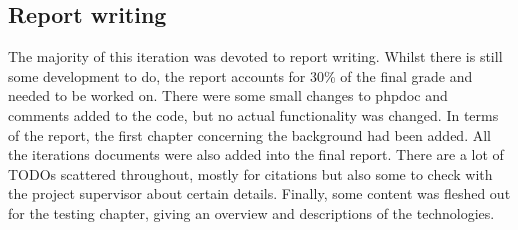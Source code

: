 \subsection{Report writing}
The majority of this iteration was devoted to report writing. Whilst there is still some development to do, the report accounts for 30\% of the final grade and needed to be worked on. There were some small changes to phpdoc and comments added to the code, but no actual functionality was changed. In terms of the report, the first chapter concerning the background had been added. All the iterations documents were also added into the final report. There are a lot of TODOs scattered throughout, mostly for citations but also some to check with the project supervisor about certain details. Finally, some content was fleshed out for the testing chapter, giving an overview and descriptions of the technologies.

